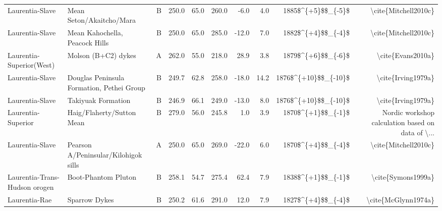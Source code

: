 \begin{longtable}{p{1 in}p{1 in}rrrrrrrr}
               Laurentia-Slave &                         Mean Seton/Akaitcho/Mara &      B &     250.0 &      65.0 & 260.0 &  -6.0 &       4.0 &     1885\$\textasciicircum \{+5\}\$\$\_\{-5\}\$ &                               \textbackslash cite\{Mitchell2010c\} \\
               Laurentia-Slave &                   Mean Kahochella, Peacock Hills &      B &     250.0 &      65.0 & 285.0 & -12.0 &       7.0 &     1882\$\textasciicircum \{+4\}\$\$\_\{-4\}\$ &                               \textbackslash cite\{Mitchell2010c\} \\
      Laurentia-Superior(West) &                              Molson (B+C2) dykes &      A &     262.0 &      55.0 & 218.0 &  28.9 &       3.8 &     1879\$\textasciicircum \{+6\}\$\$\_\{-6\}\$ &                                  \textbackslash cite\{Evans2010a\} \\
               Laurentia-Slave &        Douglas Peninsula Formation, Pethei Group &      B &     249.7 &      62.8 & 258.0 & -18.0 &      14.2 &   1876\$\textasciicircum \{+10\}\$\$\_\{-10\}\$ &                                 \textbackslash cite\{Irving1979a\} \\
               Laurentia-Slave &                               Takiyuak Formation &      B &     246.9 &      66.1 & 249.0 & -13.0 &       8.0 &   1876\$\textasciicircum \{+10\}\$\$\_\{-10\}\$ &                                 \textbackslash cite\{Irving1979a\} \\
            Laurentia-Superior &                       Haig/Flaherty/Sutton Mean  &      B &     279.0 &      56.0 & 245.8 &   1.0 &       3.9 &     1870\$\textasciicircum \{+1\}\$\$\_\{-1\}\$ &  Nordic workshop calculation based on data of \textbackslash ... \\
               Laurentia-Slave &             Pearson A/Peninsular/Kilohigok sills &      A &     250.0 &      65.0 & 269.0 & -22.0 &       6.0 &     1870\$\textasciicircum \{+4\}\$\$\_\{-4\}\$ &                               \textbackslash cite\{Mitchell2010c\} \\
 Laurentia-Trans-Hudson orogen &                              Boot-Phantom Pluton &      B &     258.1 &      54.7 & 275.4 &  62.4 &       7.9 &     1838\$\textasciicircum \{+1\}\$\$\_\{-1\}\$ &                                 \textbackslash cite\{Symons1999a\} \\
                 Laurentia-Rae &                                    Sparrow Dykes &      B &     250.2 &      61.6 & 291.0 &  12.0 &       7.9 &     1827\$\textasciicircum \{+4\}\$\$\_\{-4\}\$ &                                \textbackslash cite\{McGlynn1974a\} \\

\end{longtable}
